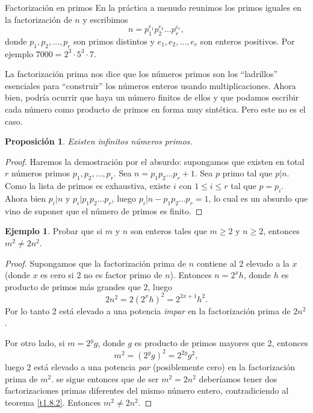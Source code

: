 \documentclass[11pt,spanish,makeidx]{amsbook}
\newtheorem{proposicion}[teorema]{Proposici\'on}
\theoremstyle{definition}
\newtheorem{ejemplo}{Ejemplo}[section]
\theoremstyle{remark}
\begin{document}
\begin{section}{Factorización en primos}
En la práctica a menudo reunimos los primos iguales en la factorización de $n$ y escribimos
\begin{equation}\label{factpri}
n=p_1^{e_1}p_2^{e_2}\ldots p_r^{e_r},
\end{equation}
donde $p_1,p_2,\ldots ,p_r$ son primos distintos y $e_1,e_2,\ldots,e_r$ son enteros positivos. Por ejemplo $ 7000 = 2^3 \cdot 5^3 \cdot 7$.

La factorización prima nos dice que los números primos son los  ``ladrillos'' esenciales para ``construir'' los números enteros usando multiplicaciones. Ahora bien, podría ocurrir que haya un número finitos de ellos y que podamos escribir cada número como producto de primos en forma muy sintética. Pero este no es el caso.

\begin{proposicion} Existen infinitos números primos. 
\end{proposicion} 
\begin{proof} Haremos la demostración por el absurdo: supongamos que existen en total $r$ números primos $p_1,p_2,\ldots, p_r$. Sea $n =  p_1p_2\ldots p_r+1$. Sea $p$ primo tal que $p|n$. Como la lista de primos es exhaustiva, existe $i$ con $1 \le i \le r$ tal que $p=p_i$. Ahora bien $p_i| n$ y $p_i|p_1p_2\ldots p_r$, luego $p_i|n-p_1p_2\ldots p_r =1$, lo cual es un absurdo que vino de suponer que el número de primos es finito.  
\end{proof}

\begin{ejemplo} Probar que si $m$ y $n$ son enteros tales que $m\ge 2$ y $n\ge 2$, entonces $m^2 \not=2n^2$.
\end{ejemplo}
\begin{proof} Supongamos que la factorización prima de $n$ contiene al 2 elevado a la $x$ (donde $x$ es cero si 2 no es factor primo de $n$). Entonces $n=2^xh$, donde $h$ es producto de primos más grandes que 2, luego
$$
2n^2=2(2^xh)^2= 2^{2x+1}h^2.
$$
Por lo tanto 2 está elevado a una potencia {\it impar} en la factorización prima de $2n^2$.

Por otro lado, si $m=2^yg$, donde $g$ es producto de primos mayores que 2, entonces
$$
m^2= (2^yg)^2 = 2^{2y}g^2,
$$
luego 2 está elevado a una potencia {\it par} (posiblemente cero) en la factorización prima de $m^2$. se sigue entonces que de ser $m^2 = 2n^2$ deberíamos tener dos factorizaciones primas diferentes del mismo número entero, contradiciendo al teorema \ref{t1.8.2}. Entonces $m^2 \not= 2n^2$.
\end{proof}


\end{section}
\end{document}
